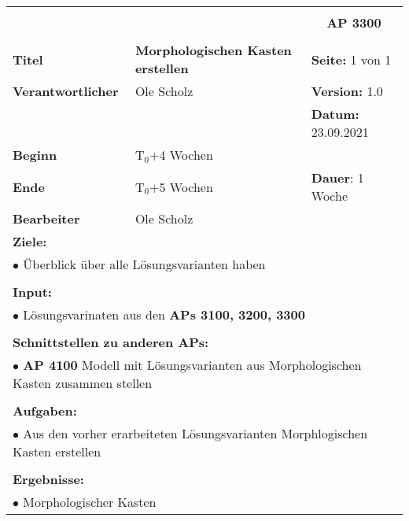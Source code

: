 \clearpage
\begin{table}[!h]
	\begin{center}
		\begin{tabular}{|p{35mm}||p{55mm}|p{50mm}||p{40mm}|}
			\hline
			\multicolumn{3}{|l||}{\textbf{}} & \multicolumn{1}{c|}{}\\
			\multicolumn{3}{|l||}{\textbf{}} & \multicolumn{1}{c|}{\textbf{AP 3300}}\\
			\multicolumn{3}{|l||}{\textbf{}} & \multicolumn{1}{c|}{}\\
			\hline\hline
			\textbf{Titel} & \multicolumn{2}{p{7cm}||}{\textbf{Morphologischen Kasten erstellen}} 
			& \textbf{Seite:} 1 von 1\\
			\hline
			\textbf{Verantwortlicher} & \multicolumn{2}{l||}{Ole Scholz} & \textbf{Version:} 1.0\\
			\hline
			\multicolumn{3}{|l||}{} & \textbf{Datum:} 23.09.2021\\
			\hline\hline
			\textbf{Beginn} & \multicolumn{2}{l||}{T$_0$+4 Wochen} & \\
			\hline
			\textbf{Ende} & \multicolumn{2}{l||}{T$_0$+5 Wochen} & \textbf{Dauer}: 1 Woche\\
			\hline\hline
			\textbf{Bearbeiter} & \multicolumn{3}{l|}{Ole Scholz}\\
			\hline\hline
			\multicolumn{4}{|p{150mm}|}{\textbf{Ziele:}}\\
			\multicolumn{4}{|p{150mm}|}{$\bullet$ Überblick über alle Lösungsvarianten haben}\\
			\multicolumn{4}{|p{150mm}|}{}\\
			\multicolumn{4}{|p{150mm}|}{\textbf{Input:}}\\
			\multicolumn{4}{|p{150mm}|}{$\bullet$ Lösungsvarinaten aus den \textbf{APs 3100, 3200, 3300}}\\
			\multicolumn{4}{|p{150mm}|}{}\\
			\multicolumn{4}{|p{150mm}|}{\textbf{Schnittstellen zu anderen APs:}}\\
			\multicolumn{4}{|p{150mm}|}{$\bullet$ \textbf{AP 4100} Modell mit Lösungsvarianten aus Morphologischen Kasten zusammen stellen}\\
			\multicolumn{4}{|p{150mm}|}{}\\
			\multicolumn{4}{|p{150mm}|}{\textbf{Aufgaben:}}\\
			\multicolumn{4}{|p{150mm}|}{$\bullet$ Aus den vorher erarbeiteten Lösungsvarianten Morphlogischen Kasten erstellen}\\
			\multicolumn{4}{|p{150mm}|}{}\\
			\multicolumn{4}{|p{150mm}|}{\textbf{Ergebnisse:}}\\
			\multicolumn{4}{|p{150mm}|}{$\bullet$ Morphologischer Kasten}\\
			\hline
		\end{tabular}
	\end{center}
\end{table}

